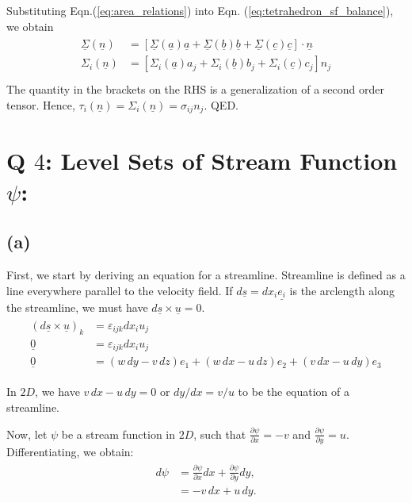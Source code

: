 \documentclass{article}
\begin{document}
Substituting Eqn.(\ref{eq:area_relations}) into Eqn. (\ref{eq:tetrahedron_sf_balance}), we obtain
\begin{align}
 \begin{split}
  \underline{\Sigma}(\underline{n}) &= \left[\underline{\Sigma}(\underline{a}) \underline{a} + \underline{\Sigma}(\underline{b}) \underline{b} + \underline{\Sigma}(\underline{c}) \underline{c}\right]\cdot \underline{n} \\
  \Sigma_{i}(\underline{n}) &= \left[\Sigma_{i}(\underline{a}) a_{j} + \Sigma_{i}(\underline{b}) b_{j} + \Sigma_{i}(\underline{c}) c_{j}\right]n_{j}\\
 \end{split}
\end{align}
The quantity in the brackets on the RHS is a generalization of a second order tensor. Hence, $\boxed{\tau_{i}(\underline{n}) = \Sigma_{i}(\underline{n}) = \sigma_{ij} n_{j}}.$ QED.
\section{Q $4$: Level Sets of Stream Function $\psi$:}
\subsection*{(a)}

First, we start by deriving an equation for a streamline. Streamline is defined as a line everywhere parallel to the velocity field. If $d\underline{s} = dx_{i}\underline{e_{i}}$ is the arclength along the streamline, we must have $d\underline{s} \times \underline{u} = 0$. 
\begin{align}\label{eq:streamline}
 \begin{split}
    (d\underline{s} \times \underline{u})_{k} &= \varepsilon_{ijk} dx_{i} u_{j} \\
    \underline{0} & = \varepsilon_{ijk} dx_{i} u_{j}\\
    \underline{0} &= (w \, dy -  v \, dz )e_{1} + (w \, dx  - u \, dz )e_{2} +(v\,dx - u \, dy)e_{3}
 \end{split}
\end{align}

In $2D$, we have $v\,dx - u \, dy = 0$ or $dy/dx = v/u$ to be the equation of a streamline. 

Now, let $\psi$ be a stream function in $2D$, such that $\frac{\partial \psi}{\partial x} = - v$ and $\frac{\partial \psi}{\partial y} = u$. Differentiating, we obtain:
\begin{align}\label{eq:psi_diff}
 \begin{split}
  d\psi & = \frac{\partial \psi}{\partial x} dx + \frac{\partial \psi}{\partial y} dy, \\
  & = -v \, dx + u \, dy. 
 \end{split}
\end{align}
\end{document}
